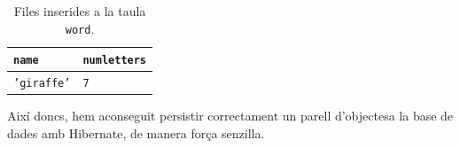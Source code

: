 \begin{table}[h]
	\begin{center}
		\begin{tabular}{|l|l|}
			\hline
			\texttt{name} & \texttt{numletters} \\
			\hline \hline
			\texttt{'giraffe'} & \texttt{7} \\
			\hline
		\end{tabular}
	\end{center}
	\caption{Files inserides a la taula \texttt{word}.}
	\label{table:selectword}
\end{table}

Així doncs, hem aconseguit persistir correctament un parell d'objectesa la base de dades amb Hibernate, de manera força senzilla.